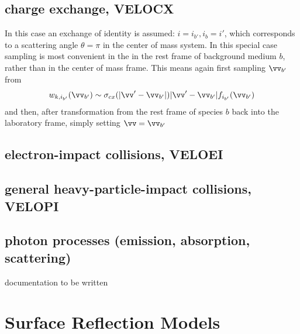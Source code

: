 \subsection{charge exchange, VELOCX}
In this case an exchange of identity is assumed:  $i = i_{b'},   i_b = i'$, which corresponds to a scattering angle
$\theta = \pi$ in the center of mass system. In this special case sampling is most convenient in the
in the rest frame of background medium $b$, rather than in the center of mass frame. This means again first sampling
$\vv_{b'}$ from
\begin{displaymath}
w_{k,i_{b'}}(\vv_{b'}) \sim \sigma_{cx}(|\vv'-\vv_{b'}|) |\vv'-\vv_{b'}| f_{i_{b'}}(\vv_{b'})
\end{displaymath}
and then, after transformation from the rest frame of species $b$ back into the laboratory frame, simply setting $\vv = \vv_{b'}$
\subsection{electron-impact collisions, VELOEI}
\subsection{general heavy-particle-impact collisions, VELOPI }
\subsection{photon processes (emission, absorption, scattering)}
documentation to be written
\newpage
\section{Surface Reflection Models} \label{sec1.3}

